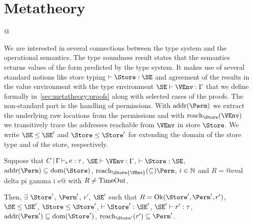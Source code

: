 \section{Metatheory}
\label{sec:metatheory}

\lstMakeShortInline[style=rule]@

We are interested in several connections between the type system and
the operational semantics. The type soundness result states
that the semantics returns values of the form predicted by the type
system. It makes use of several standard notions like store typing
$\vdash \Store : \SE$ and agreement of the results in the value environment
with the type environment $\SE \vdash \VEnv:\E$ that we define
formally in~\cref{sec:metatheory:proofs} along with selected cases of the proofs. The
non-standard part is the handling of permissions. With
$\Addresses\Perm$ we extract the underlying raw locations from the
permissions and with $\Reach\Store\VEnv$ we transitively trace the
addresses reachable from $\VEnv$ in store $\Store$. We write
$\SE\le\SE'$ and $\Store \le \Store'$ for extending the domain of the
store type and of the store, respectively.

\begin{theorem}\label{theorem:type-soundness}
  Suppose that
    $C \operatorname{|} \Gamma \operatorname{\vdash_s} e : \tau$,
    $\SE \vdash \VEnv : \E$,
    $\vdash \Store : \SE$,
    $\Addresses\Perm \subseteq \Dom\Store$,
    $\Reach\Store{\VEnv} \subseteq \Perm$,
    $i\in\mathbb{N}$ and
    $R = $@eval delta pi gamma i e@
    with $R\ne \operatorname{TimeOut}$.

  Then,
  $\exists$ $\Store'$, $\Perm'$, $r'$, $\SE'$ such that
    $R = \Ok{\Store', \Perm', r'}$,
    $\SE \le \SE'$, $\Store \le \Store'$,
    $\vdash \Store' : \SE'$,
    $\SE' \vdash r' : \tau$,
    $\Addresses{\Perm'} \subseteq \Dom{\Store'}$,
    $\Reach{\Store'}{r'} \subseteq \Perm'$.
\end{theorem}

